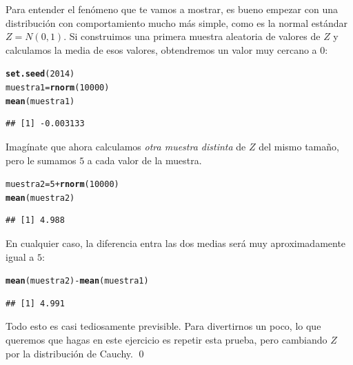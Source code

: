 \documentclass[10pt,a4paper]{article}\usepackage[]{graphicx}\usepackage[]{color}
\makeatletter
\newcommand{\hlnum}[1]{\textcolor[rgb]{0.686,0.059,0.569}{#1}}%
\newcommand{\hlopt}[1]{\textcolor[rgb]{0,0,0}{#1}}%
\newcommand{\hlstd}[1]{\textcolor[rgb]{0.345,0.345,0.345}{#1}}%
\newcommand{\hlkwb}[1]{\textcolor[rgb]{0.69,0.353,0.396}{#1}}%
\newcommand{\hlkwd}[1]{\textcolor[rgb]{0.737,0.353,0.396}{\textbf{#1}}}%
\newenvironment{kframe}{%
 \def\at@end@of@kframe{}%
 \ifinner\ifhmode%
  \def\at@end@of@kframe{\end{minipage}}%
  \begin{minipage}{\columnwidth}%
 \fi\fi%
 \def\FrameCommand##1{\hskip\@totalleftmargin \hskip-\fboxsep
 \colorbox{shadecolor}{##1}\hskip-\fboxsep
     \hskip-\linewidth \hskip-\@totalleftmargin \hskip\columnwidth}%
 \MakeFramed {\advance\hsize-\width
   \@totalleftmargin\z@ \linewidth\hsize
   \@setminipage}}%
 {\par\unskip\endMakeFramed%
 \at@end@of@kframe}
\newenvironment{knitrout}{}{} %
\makeatother
\begin{document}
\begin{ejercicio}
Para entender el fenómeno que te vamos a mostrar, es bueno empezar con una distribución con comportamiento mucho más simple, como es la normal estándar $Z = N(0, 1)$. Si construimos una primera muestra aleatoria de valores de $Z$ y calculamos la media de esos valores, obtendremos un valor muy cercano a $0$:
\begin{knitrout}
\color{fgcolor}\begin{kframe}
\begin{alltt}
\hlkwd{set.seed}\hlstd{(}\hlnum{2014}\hlstd{)}
\hlstd{muestra1} \hlkwb{=} \hlkwd{rnorm}\hlstd{(}\hlnum{10000}\hlstd{)}
\hlkwd{mean}\hlstd{(muestra1)}
\end{alltt}
\begin{verbatim}
## [1] -0.003133
\end{verbatim}
\end{kframe}
\end{knitrout}
Imagínate que ahora calculamos {\em otra muestra distinta} de $Z$ del mismo tamaño, pero le sumamos $5$ a cada valor de la muestra.
\begin{knitrout}
\color{fgcolor}\begin{kframe}
\begin{alltt}
\hlstd{muestra2} \hlkwb{=} \hlnum{5} \hlopt{+} \hlkwd{rnorm}\hlstd{(}\hlnum{10000}\hlstd{)}
\hlkwd{mean}\hlstd{(muestra2)}
\end{alltt}
\begin{verbatim}
## [1] 4.988
\end{verbatim}
\end{kframe}
\end{knitrout}
En cualquier caso, la diferencia entra las dos medias será muy aproximadamente igual a $5$:
\begin{knitrout}
\color{fgcolor}\begin{kframe}
\begin{alltt}
\hlkwd{mean}\hlstd{(muestra2)} \hlopt{-} \hlkwd{mean}\hlstd{(muestra1)}
\end{alltt}
\begin{verbatim}
## [1] 4.991
\end{verbatim}
\end{kframe}
\end{knitrout}
Todo esto es casi tediosamente previsible. Para divertirnos un poco, lo que queremos que hagas en este ejercicio es repetir esta prueba, pero cambiando $Z$ por la distribución de Cauchy.
\qed
\end{ejercicio}
\end{document}
